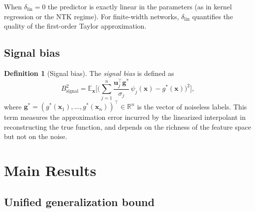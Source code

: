 \documentclass[12pt]{amsart}
\theoremstyle{definition}
\newtheorem{definition}[theorem]{Definition}
\theoremstyle{remark}
\newcommand{\R}{\mathbb{R}}
\newcommand{\E}{\mathbb{E}}
\newcommand{\bx}{\mathbf{x}}
\newcommand{\bu}{\mathbf{u}}
\newcommand{\bg}{\mathbf{g}}
\begin{document}
When $\delta_{\mathrm{lin}} = 0$ the predictor is exactly linear in the
parameters (as in kernel regression or the NTK regime).  For finite-width
networks, $\delta_{\mathrm{lin}}$ quantifies the quality of the first-order
Taylor approximation.

\subsection{Signal bias}

\begin{definition}[Signal bias]\label{def:signal-bias}
The \emph{signal bias} is defined as
\begin{equation}\label{eq:signal-bias}
  B_{\mathrm{signal}}^{2}
  = \E_{\bx}\Biggl[
      \Biggl(
        \sum_{j=1}^{n}
        \frac{\bu_{j}^{\top} \bg^{*}}{\sigma_{j}}\,\psi_{j}(\bx)
        - g^{*}(\bx)
      \Biggr)^{\!2}
    \Biggr],
\end{equation}
where $\bg^{*} = (g^{*}(\bx_{1}), \ldots, g^{*}(\bx_{n}))^{\top} \in \R^{n}$
is the vector of noiseless labels.  This term measures the approximation error
incurred by the linearized interpolant in reconstructing the true function, and
depends on the richness of the feature space but not on the noise.
\end{definition}

\section{Main Results}\label{sec:main}

\subsection{Unified generalization bound}
\end{document}
